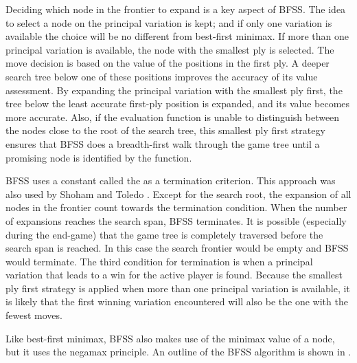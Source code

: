 Deciding which node in the frontier to expand is a key aspect of BFSS.  The idea to select a node on the principal variation is kept; and if only one variation is available the choice will be no different from best-first minimax.  If more than one principal variation is available, the node with the smallest ply is selected.  The move decision is based on the value of the positions in the first ply.  A deeper search tree below one of these positions improves the accuracy of its value assessment.  By expanding the principal variation with the smallest ply first, the tree below the least accurate first-ply position is expanded, and its value becomes more accurate. Also, if the evaluation function is unable to distinguish between the nodes close to the root of the search tree, this smallest ply first strategy ensures that BFSS does a breadth-first walk through the game tree until a promising node is identified by the function. 

BFSS uses a constant called the  as a termination criterion. This approach was also used by Shoham and Toledo \cite{shoham:randomized}.  Except for the search root, the expansion of all nodes in the frontier count towards the termination condition.  When the number of expansions reaches the search span, BFSS terminates.  It is possible (especially during the end-game) that the game tree is completely traversed before the search span is reached.  In this case the search frontier would be empty and BFSS would terminate.  The third condition for termination is when a principal variation that leads to a win for the active player is found.  Because the smallest ply first strategy is applied when more than one principal variation is available, it is likely that the first winning variation encountered will also be the one with the fewest moves.

Like best-first minimax, BFSS also makes use of the minimax value of a node, but it uses the negamax principle.  An outline of the BFSS algorithm is shown in .

